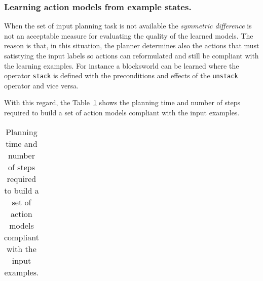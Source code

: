 \documentclass[letterpaper]{article} %
\begin{document}
\subsubsection{Learning action models from example states.}
When the set of input planning task is not available the {\em symmetric difference} is not an acceptable measure for evaluating the quality of the learned models. The reason is that, in this situation, the planner determines also the actions that must satistying the input labels so actions can reformulated and still be compliant with the learning examples. For instance a blocksworld can be learned where the operator {\small\tt stack} is defined with the preconditions and effects of the {\small\tt unstack} operator and vice versa. 

With this regard, the Table~\ref{tab:noplans} shows the planning time and number of steps required to build a set of action models compliant with the input examples.


\begin{table}[hbt!]
\begin{footnotesize}
\begin{tabular}{cc}

\end{tabular}
\end{footnotesize}
\caption{\small Planning time and number of steps required to build a set of action models compliant with the input examples.}
  \label{tab:noplans}
\end{table}




\end{document}
